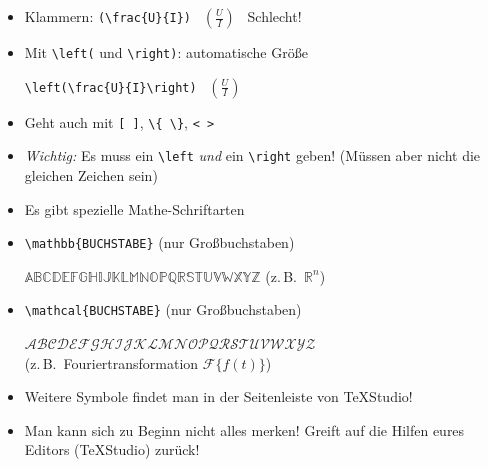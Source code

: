 \begin{frame}[<+->][fragile]
	\begin{itemize}
		\item Klammern: \lstinline!(\frac{U}{I})! \textrightarrow~$\displaystyle(\frac{U}{I})$ \textrightarrow~Schlecht!
		\item Mit \lstinline!\left(! und \lstinline!\right)!: automatische Größe
		
		\lstinline!\left(\frac{U}{I}\right)! \textrightarrow\ $\displaystyle\left(\frac{U}{I}\right)$
		\item Geht auch mit \lstinline![ ]!, \lstinline!\{ \}!, \lstinline!< >!
		\item \emph{Wichtig:} Es muss ein \lstinline!\left! \emph{und} ein \lstinline!\right! geben! (Müssen aber nicht die gleichen Zeichen sein)
		\item Es gibt spezielle Mathe-Schriftarten
		\item \lstinline!\mathbb{BUCHSTABE}! (nur Großbuchstaben)
		
		$\mathbb{ABCDEFGHIJKLMNOPQRSTUVWXYZ}$ (z.\,B.\ $\mathbb{R}^n$)
		\item \lstinline!\mathcal{BUCHSTABE}! (nur Großbuchstaben)
		
		$\mathcal{ABCDEFGHIJKLMNOPQRSTUVWXYZ}$\\
		(z.\,B.\ Fouriertransformation $\mathcal{F}\{f(t)\}$)
		
		\item Weitere Symbole findet man in der Seitenleiste von TeXStudio!
		\item Man kann sich zu Beginn nicht alles merken! Greift auf die Hilfen eures Editors (TeXStudio) zurück!
	\end{itemize}
\end{frame}


